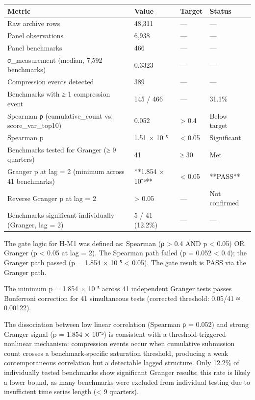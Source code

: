 \begin{table}[htbp]
\centering
\begin{tabular}{llll}
\toprule
Metric & Value & Target & Status \\
\midrule
Raw archive rows & 48,311 & — & — \\
Panel observations & 6,938 & — & — \\
Panel benchmarks & 466 & — & — \\
σ_measurement (median, 7,592 benchmarks) & 0.3323 & — & — \\
Compression events detected & 389 & — & — \\
Benchmarks with ≥ 1 compression event & 145 / 466 & — & 31.1\% \\
Spearman ρ (cumulative_count vs. score_var_top10) & 0.052 & > 0.4 & Below target \\
Spearman p & 1.51 × 10⁻⁵ & < 0.05 & Significant \\
Benchmarks tested for Granger (≥ 9 quarters) & 41 & ≥ 30 & Met \\
Granger p at lag = 2 (minimum across 41 benchmarks) & **1.854 × 10⁻⁵** & < 0.05 & **PASS** \\
Reverse Granger p at lag = 2 & > 0.05 & — & Not confirmed \\
Benchmarks significant individually (Granger, lag = 2) & 5 / 41 (12.2\%) & — & — \\
\bottomrule
\end{tabular}
\end{table}

The gate logic for H-M1 was defined as: Spearman (ρ > 0.4 AND p < 0.05) OR Granger (p < 0.05 at lag = 2). The Spearman path failed (ρ = 0.052 < 0.4); the Granger path passed (p = 1.854 × 10⁻⁵ < 0.05). The gate result is PASS via the Granger path.

The minimum p = 1.854 × 10⁻⁵ across 41 independent Granger tests passes Bonferroni correction for 41 simultaneous tests (corrected threshold: 0.05/41 ≈ 0.00122).

The dissociation between low linear correlation (Spearman ρ = 0.052) and strong Granger signal (p = 1.854 × 10⁻⁵) is consistent with a threshold-triggered nonlinear mechanism: compression events occur when cumulative submission count crosses a benchmark-specific saturation threshold, producing a weak contemporaneous correlation but a detectable lagged structure. Only 12.2\% of individually tested benchmarks show significant Granger results; this rate is likely a lower bound, as many benchmarks were excluded from individual testing due to insufficient time series length (< 9 quarters).

